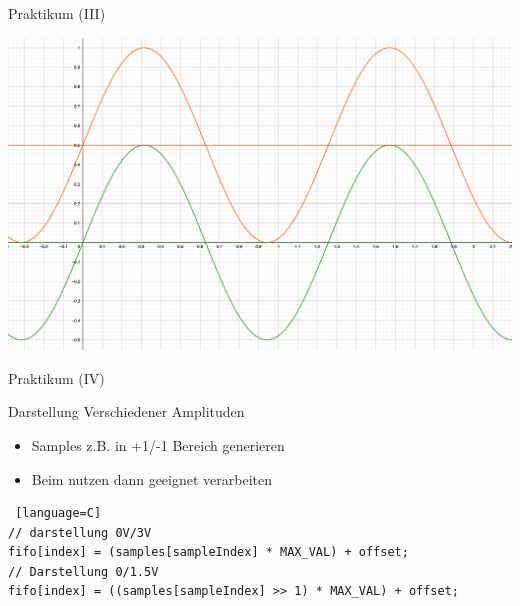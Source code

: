   \begin{frame} {Praktikum (III)}
    \begin{center}
      \includegraphics[height = .8\textheight]{figs/sinus.png}
    \end{center}
  \end{frame}



  \begin{frame} [fragile] {Praktikum (IV)}
    \begin{block} {Darstellung Verschiedener Amplituden}  
      \begin{itemize}
          \item Samples z.B. in +1/-1 Bereich generieren
          \item Beim nutzen dann geeignet verarbeiten
      \end{itemize}
    \end{block}
    \begin{lstlisting} [language=C]
// darstellung 0V/3V
fifo[index] = (samples[sampleIndex] * MAX_VAL) + offset;
// Darstellung 0/1.5V
fifo[index] = ((samples[sampleIndex] >> 1) * MAX_VAL) + offset;
    \end{lstlisting}
  \end{frame}

